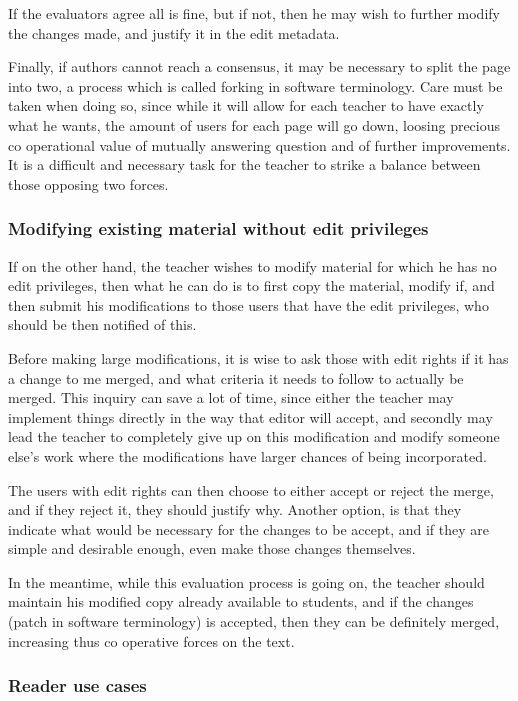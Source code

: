 \documentclass[12pt]{article}
\begin{document}
If the evaluators agree all is fine, but if not, then he may wish to further modify the changes made, and justify it in the edit metadata.

Finally, if authors cannot reach a consensus, it may be necessary to split the page into two, a process which is called forking in software terminology. Care must be taken when doing so, since while it will allow for each teacher to have exactly what he wants, the amount of users for each page will go down, loosing precious co operational value of mutually answering question and of further improvements. It is a difficult and necessary task for the teacher to strike a balance between those opposing two forces.

\subsubsection{Modifying existing material without edit privileges}

If on the other hand, the teacher wishes to modify material for which he has no edit privileges, then what he can do is to first copy the material, modify if, and then submit his modifications to those users that have the edit privileges, who should be then notified of this.

Before making large modifications, it is wise to ask those with edit rights if it has a change to me merged, and what criteria it needs to follow to actually be merged. This inquiry can save a lot of time, since either the teacher may implement things directly in the way that editor will accept, and secondly may lead the teacher to completely give up on this modification and modify someone else's work where the modifications have larger chances of being incorporated.

The users with edit rights can then choose to either accept or reject the merge, and if they reject it, they should justify why. Another option, is that they indicate what would be necessary for the changes to be accept, and if they are simple and desirable enough, even make those changes themselves.

In the meantime, while this evaluation process is going on, the teacher should maintain his modified copy already available to students, and if the changes (patch in software terminology) is accepted, then they can be definitely merged, increasing thus co operative forces on the text.

\subsubsection{Reader use cases} \label{reader-use-cases}
\end{document}
